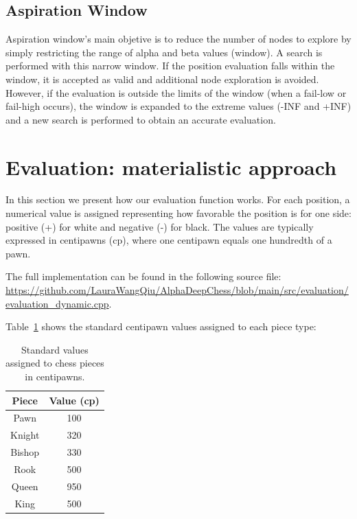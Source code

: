 \subsection*{Aspiration Window}

Aspiration window's main objetive is to reduce the number of nodes to explore by simply restricting the range of alpha and beta values (window). A search is performed with this narrow window. If the position evaluation falls within the window, it is accepted as valid and additional node exploration is avoided. However, if the evaluation is outside the limits of the window (when a fail-low or fail-high occurs), the window is expanded to the extreme values (-INF and +INF) and a new search is performed to obtain an accurate evaluation. ~\cite{AspirationWindow}

\newpage

\section{Evaluation: materialistic approach}
\label{sec:evaluation}

In this section we present how our evaluation function works. For each position, a numerical value is assigned representing how favorable the position is for one side: positive (+) for white and negative (-) for black. The values are typically expressed in centipawns (cp), where one centipawn equals one hundredth of a pawn. ~\cite{Shannon1950}

\vspace{1em}

\noindent The full implementation can be found in the following source file: \\
\scriptsize\url{https://github.com/LauraWangQiu/AlphaDeepChess/blob/main/src/evaluation/evaluation_dynamic.cpp}\normalsize.

\vspace{2em}

\noindent Table~\ref{tab:piece-values} shows the standard centipawn values assigned to each piece type:

\begin{table}[H]
    \centering
    \begin{tabular}{|c|c|}
        \hline
        Piece & Value (cp)\\ \hline
        Pawn & 100 \\ \hline
        Knight & 320 \\ \hline
        Bishop & 330 \\ \hline
        Rook & 500 \\ \hline
        Queen & 950 \\ \hline
        King & 500 \\ \hline
    \end{tabular}
    \caption{Standard values assigned to chess pieces in centipawns.}
    \label{tab:piece-values}
\end{table}

